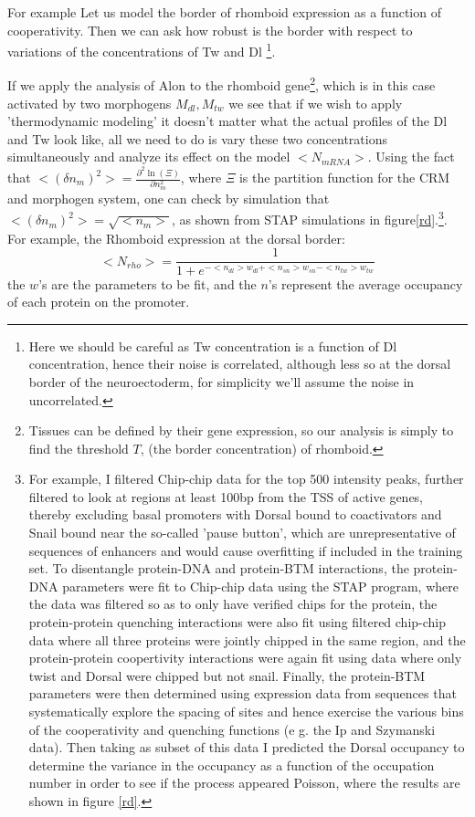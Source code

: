 For example Let us model the  border of rhomboid expression as a function of cooperativity.  Then we can ask how robust is the border with respect to variations of the concentrations of Tw and Dl \footnote[2]{Here we should be careful as Tw concentration is a function of Dl concentration, hence their noise is correlated, although less so at the dorsal border of the neuroectoderm, for simplicity we'll assume the noise in uncorrelated.}.

If we apply the analysis of Alon to the rhomboid gene\footnote[3]{Tissues can be defined by their gene expression, so our analysis is simply to find the threshold $T$, (the border concentration) of rhomboid.}, which is in this case activated by two morphogens $M_{dl}, M_{tw}$ we see that if we wish to apply 'thermodynamic modeling' it doesn't matter what the actual profiles of the Dl and Tw look like, all we need to do is vary these two concentrations simultaneously and analyze its effect on the model $<N_{mRNA}>$.  Using the fact that $ < ( \delta n_m )^2 > = \frac{\partial^2 \ln(\Xi)}{\partial n_m^2 }$, where $\Xi$ is the partition function for the CRM and morphogen system, one can check by simulation that $ < ( \delta n_m )^2 >= \sqrt{<n_m>}$, as shown from STAP simulations in figure\ref{rd}.\footnote{For example, I filtered Chip-chip data for the top 500 intensity peaks, further filtered to look at regions at least 100bp from the TSS of active genes, thereby excluding basal promoters with Dorsal bound to coactivators and Snail bound near the so-called 'pause button', which are unrepresentative of sequences of enhancers and would cause overfitting if included in the training set. To disentangle protein-DNA and protein-BTM interactions, the protein-DNA parameters were fit to Chip-chip data using the STAP program, where the data was filtered so as to only have verified chips for the protein, the protein-protein quenching interactions were also fit using filtered chip-chip data where all three proteins were jointly chipped in the same region, and the protein-protein coopertivity interactions were again fit using data where only twist and Dorsal were chipped but not snail.  Finally, the protein-BTM parameters were then determined using expression data from sequences that systematically explore the spacing of sites and hence exercise the various bins of the cooperativity and quenching functions (e g. the Ip and Szymanski data).  Then taking as subset of this data I predicted the Dorsal occupancy to determine the variance in the occupancy as a function of the occupation number in order to see if the process appeared Poisson, where the results are shown in figure \ref{rd}.}.  
For example, the Rhomboid expression at the dorsal border:
\begin{equation}\label{}
    <N_{rho} > = \frac{1}{1+e^{-<n_{dl}>w_{dl} + <n_{sn}>w_{sn} -<n_{tw}>w_{tw}}}
\end{equation}
the $w$'s are the parameters to be fit, and the $n$'s represent the average occupancy of each protein on the promoter.

